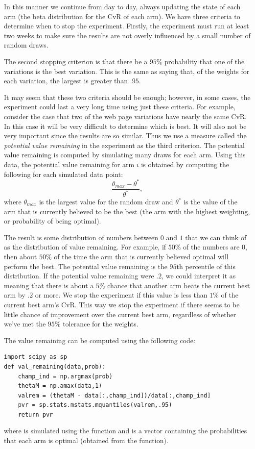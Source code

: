 In this manner we continue from day to day, always updating the state of each arm
(the beta distribution for the CvR of each arm).  We have three criteria to determine
when to stop the experiment.
Firstly, the experiment must run at least two weeks to make sure the
results are not overly influenced by a small number of random draws.

The second stopping criterion is that there be a $95\%$ probability that one
of the variations is the best variation.
This is the same as saying that, of the weights for each variation, the largest
is greater than $.95$.

It may seem that these two criteria should be enough; however, in some cases, the
experiment could last a very long time using just these criteria.
For example, consider the case that two of the web page variations have nearly the same CvR.
In this case it will be very difficult to determine which is best.
It will also not be very important since the results are so similar.
Thus we use a measure called the \emph{potential value remaining}
in the experiment as the third criterion.  The potential value remaining is computed by
simulating many draws for each arm.  Using this data, the potential value remaining
for arm $i$ is obtained by computing the following for each simulated data point:
\begin{equation}\label{valrem}
\frac{\theta_{max} - \theta^*}{\theta^*},
\end{equation}
where $\theta_{max}$ is the largest value for the random draw and $\theta^*$ is the
value of the arm that is currently believed to be the best
(the arm with the highest weighting, or probability of being optimal).

The result is some distribution of numbers between $0$ and $1$ that we can think
of as the distribution of value remaining.  For example, if $50\%$ of the numbers are 0,
then about $50\%$ of the time the arm that is currently believed optimal will perform the best.
The potential value remaining is the $95$th percentile of this distribution.
If the potential value remaining were $.2$, we could interpret it as meaning
that there is about a $5\%$ chance that another arm beats the current best arm by $.2$ or more.
We stop the experiment if this value is less than $1\%$ of the current best arm's CvR.
This way we stop the experiment if there seems to be little chance of improvement over
the current best arm, regardless of whether we've met the $95\%$ tolerance for the weights.

The value remaining can be computed using the following code:
\begin{lstlisting}
import scipy as sp
def val_remaining(data,prob):
    champ_ind = np.argmax(prob)
    thetaM = np.amax(data,1)
    valrem = (thetaM - data[:,champ_ind])/data[:,champ_ind]
    pvr = sp.stats.mstats.mquantiles(valrem,.95)
    return pvr
\end{lstlisting}
where  is simulated using the  function
and  is a vector containing the probabilities that each arm is optimal
(obtained from the  function).

